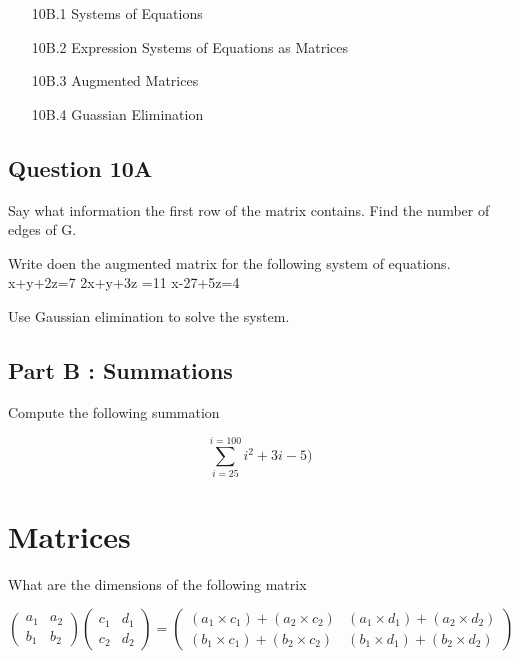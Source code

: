 \documentclass[]{report}
\begin{document}
{{{{{{\begin{itemize}
\item[10B.1] Systems of Equations
\item[10B.2] Expression Systems of Equations as Matrices
\item[10B.3] Augmented Matrices
\item[10B.4] Guassian Elimination
\end{itemize}
\subsection*{Question 10A}

Say what information the first row of the matrix contains.
Find the number of edges of G.


Write doen the augmented matrix for the following system of equations.
x+y+2z=7
2x+y+3z =11
x-27+5z=4


Use Gaussian elimination to solve the system.

\subsection*{Part B : Summations}

Compute the following summation

\[ \sum^{i=100}_{i=25} i^2 + 3i -5)\]

\section{Matrices}

What are the dimensions of the following matrix


\[ \left(
\begin{array}{cc}
a_1 & a_2 \\ 
b_1 & b_2
\end{array} \right)\left(
\begin{array}{cc}
c_1 & d_1 \\ 
c_2 & d_2
\end{array} \right) = \left(
\begin{array}{cc}
(a_1 \times c_1) + (a_2 \times c_2) & (a_1 \times d_1) + (a_2 \times d_2) \\ 
(b_1 \times c_1) + (b_2 \times c_2) & (b_1 \times d_1) + (b_2 \times d_2)
\end{array} \right) \]

}}}}}}
\end{document}
